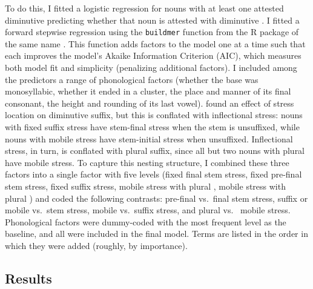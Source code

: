 \documentclass[output=paper,colorlinks,citecolor=brown
]{langscibook}
\begin{document}
To do this, I fitted a logistic regression for nouns with at least one attested diminutive predicting whether that noun is attested with diminutive \ok{}. I fitted a forward stepwise regression using the \texttt{buildmer} function from the R package of the same name \citep{RCoreTeam2023,Voeten2023}. This function adds factors to the model one at a time such that each improves the model's Akaike Information Criterion (AIC), which measures both model fit and simplicity (penalizing additional factors). I included among the predictors a range of phonological factors (whether the base was monosyllabic, whether it ended in a cluster, the place and manner of its final consonant, the height and rounding of its last vowel). \citet{Gouskova.etal2015} found an effect of stress location on diminutive suffix, but this is conflated with inflectional stress: nouns with fixed suffix stress have stem-final stress when the stem is unsuffixed, while nouns with mobile stress have stem-initial stress when unsuffixed. Inflectional stress, in turn, is conflated with plural suffix, since all but two nouns with plural \pla{} have mobile stress. %
To capture this nesting structure, I combined these three factors into a single factor with five levels (fixed final stem stress, fixed pre-final stem stress, fixed suffix stress, mobile stress with plural \pli, mobile stress with plural \pla) and coded the following contrasts: pre-final vs.\ final stem stress, suffix or mobile vs.\ stem stress, mobile vs.\ suffix stress, and plural \pla{} vs.\ \pli{} mobile stress. Phonological factors were dummy-coded with the most frequent level as the baseline, and all were included in the final model. Terms are listed in the order in which they were added (roughly, by importance).

\subsection{Results}
\end{document}
